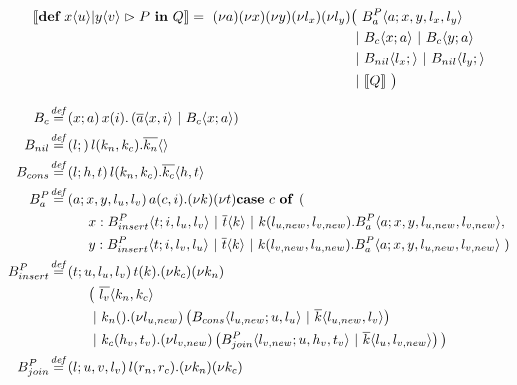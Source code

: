 \begin{align}
  \encMJtoAP{\jdef{\jrct{\jrcv{x}{u} \jpat \jrcv{y}{v}}{P}}{Q}}
  =\
  \anew{a}{\anew{x}{\anew{y}{\anew{l_x}{\anew{l_y}{
    &\big(\ \ains{B_a^P}{a}{x, y, l_x, l_y} \nonumber \\
    &\apar \ains{B_c}{x}{a} \apar \ains{B_c}{y}{a} \nonumber \\
    &\apar \ains{B_{nil}}{l_x}{} \apar \ains{B_{nil}}{l_y}{} \nonumber \\
    &\apar \encMJtoAP{Q}\ \big)
  }}}}}
\end{align}

\begin{align}
  \adef*{B_c}{x}{a}{\arcv{x}{i} . \parens{\asnd{a}{x,i} \apar \ains{B_c}{x}{a}}}
  \\
  \adef*{B_{nil}}{l}{}{\arcv{l}{k_n,k_c} . \asnd{k_n}{}}
  \\
  \adef*{B_{cons}}{l}{h,t}{\arcv{l}{k_n,k_c} . \asnd{k_c}{h,t}}
  \\
  \adef*{B_a^P}{a}{x,y,l_u,l_v}{
    \arcv{a}{c,i} . \anew{k}{\anew{t}{
      \acse{c}{ \right. \nonumber \\
        & \hspace{1cm}
          \aalt{x}{\ains{B_{insert}^P}{t}{i, l_u, l_v} \apar \asnd{t}{k} \apar \arcv{k}{l_{u,new},l_{v,new}} . \ains{B_a^P}{a}{x, y, l_{u,new}, l_{v,new}}}, \nonumber \\
        & \hspace{1cm}
          \aalt{y}{\ains{B_{insert}^P}{t}{i, l_v, l_u} \apar \asnd{t}{k} \apar \arcv{k}{l_{v,new},l_{u,new}} . \ains{B_a^P}{a}{x, y, l_{u,new}, l_{v,new}}}
    \left.}}}
  } \\
  \adef*{B_{insert}^P}{t}{u,l_u,l_v}{
    \arcv{t}{k} . \anew{k_c}{\anew{k_n}{ \nonumber \\
      & \hspace{1cm}
        \big(\ \asnd{l_v}{k_n,k_c} \nonumber \\
      & \hspace{1cm}
        \apar \arcv{k_n}{} . \anew{l_{u,new}}{\parens{\ains{B_{cons}}{l_{u,new}}{u, l_u} \apar \asnd{k}{l_{u,new},l_v}}} \nonumber \\
      & \hspace{1cm}
        \apar \arcv{k_c}{h_v,t_v} . \anew{l_{v,new}}{\parens{\ains{B_{join}^P}{l_{v,new}}{u, h_v, t_v} \apar \asnd{k}{l_u,l_{v,new}}}} \big)
    }}
  } \\
  \adef*{B_{join}^P}{l}{u,v,l_v}{
    \arcv{l}{r_n,r_c} . \anew{k_n}{\anew{k_c}{ \nonumber \\
}}}
\end{align}
